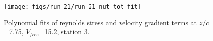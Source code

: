 \begin{figure}[H]
\centering
\texttt{[image: figs/run\_21/run\_21\_nut\_tot\_fit]}
\caption{Polynomial fits of reynolds stress and velocity gradient terms at $z/c$=7.75, $V_{free}$=15.2, station 3.}
\label{fig:run_21_nut_tot_fit}
\end{figure}


